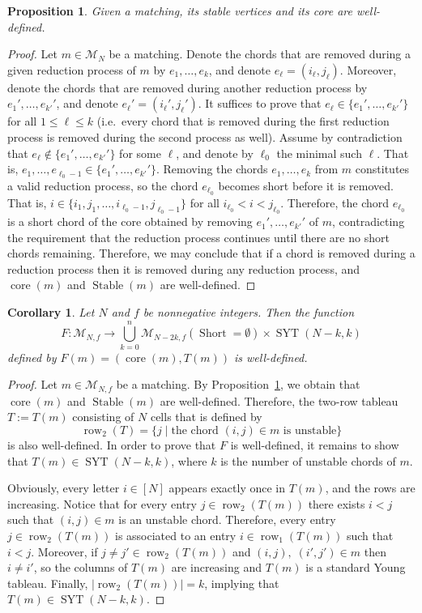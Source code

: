 \documentclass[11pt]{article}
\newtheorem{proposition}[theo]{Proposition}
\newtheorem{corollary}[theo]{Corollary}
\theoremstyle{definition}
\providecommand{\ie}{i.e.\ }
\numberwithin{equation}{section}
\newcommand{\Syt}{\operatorname{SYT}}
\newcommand{\Short}{\operatorname{Short}}
\newcommand{\Stable}{\operatorname{Stable}}
\newcommand{\core}{\operatorname{core}}
\newcommand{\row}{\operatorname{row}}
\newcommand{\M}{\mathcal{M}}
\begin{document}
\begin{proposition}
\label{prop:core well defined}
    Given a matching, its stable vertices and its core are well-defined.
\end{proposition}
\begin{proof}
    Let $m \in \M_N$ be a matching. Denote the chords that are removed during a given reduction process of $m$ by $e_1, \dots, e_k$, and denote $e_\ell = (i_\ell,j_\ell)$. Moreover, denote the chords that are removed during another reduction process by $e_1', \dots, e_{k'}'$, and denote $e_\ell' = (i_\ell',j_\ell')$. It suffices to prove that $e_\ell \in \{e_1', \dots, e_{k'}'\}$ for all $1 \le \ell \le k$ (\ie every chord that is removed during the first reduction process is removed during the second process as well). Assume by contradiction that $e_\ell \notin \{e_1', \dots, e_{k'}'\}$ for some $\ell$, and denote by $\ell_0$ the minimal such $\ell$.
    That is, $e_1,\dots,e_{\ell_0-1} \in \{e_1', \dots, e_{k'}'\}$. Removing the chords $e_1, \dots, e_k$ from $m$ constitutes a valid reduction process, so the chord $e_{\ell_0}$ becomes short before it is removed. That is, $i \in \{i_1,j_1,\dots,i_{\ell_0-1},j_{\ell_0-1}\}$ for all $i_{\ell_0} < i < j_{\ell_0}$. Therefore, the chord $e_{\ell_0}$ is a short chord of the core obtained by removing $e_1', \dots, e_{k'}'$ of $m$, contradicting the requirement that the reduction process continues until there are no short chords remaining. Therefore, we may conclude that if a chord is removed during a reduction process then it is removed during any reduction process, and $\core(m)$ and $\Stable(m)$ are well-defined.
\end{proof}
\begin{corollary}
    Let $N$ and $f$ be nonnegative integers. Then the function
    \[
        F:\M_{N,f} \to \bigcup_{k=0}^n \M_{N-2k,f}(\Short = \emptyset) \times \Syt(N-k,k)
    \]
    defined by $F(m) = (\core(m),T(m))$ is well-defined.
\end{corollary}
\begin{proof}
    Let $m\in \M_{N,f}$ be a matching. By Proposition~\ref{prop:core well defined}, we obtain that $\core(m)$ and $\Stable(m)$ are well-defined. Therefore, the two-row tableau $T:=T(m)$ consisting of $N$ cells that is defined by
    \[
        \row_2(T) = \{j \mid \text{the chord } (i,j) \in m \text{ is unstable}\}
    \]
    is also well-defined. In order to prove that $F$ is well-defined, it remains to show that $T(m) \in \Syt(N-k,k)$, where $k$ is the number of unstable chords of $m$.

    Obviously, every letter $i \in [N]$ appears exactly once in $T(m)$, and the rows are increasing. Notice that for every entry $j \in \row_2(T(m))$ there exists $i<j$ such that $(i,j) \in m$ is an unstable chord. Therefore, every entry $j \in \row_2(T(m))$ is associated to an entry $i \in \row_1(T(m))$ such that $i<j$. Moreover, if $j\ne j' \in \row_2(T(m))$ and $(i,j),\; (i',j') \in m$ then $i \ne i'$, so the columns of $T(m)$ are increasing and $T(m)$ is a standard Young tableau. Finally, $|\row_2(T(m))| = k$, implying that $T(m) \in \Syt(N-k,k)$.
\end{proof}
\end{document}
